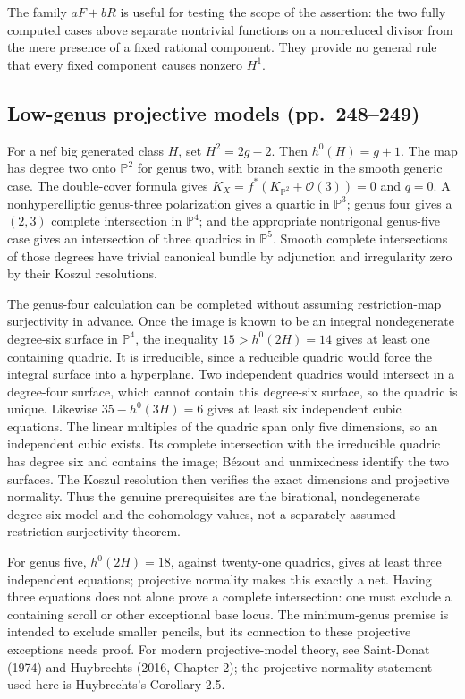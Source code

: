 The family \(aF+bR\) is useful for testing the scope of the assertion: the two fully computed cases above separate nontrivial functions on a nonreduced divisor from the mere presence of a fixed rational component. They provide no general rule that every fixed component causes nonzero \(H^1\).

\subsection{Low-genus projective models (pp.~248--249)}\label{cp2-vii-2-2}

For a nef big generated class \(H\), set \(H^2=2g-2\). Then \(h^0(H)=g+1\). The map has degree two onto \(\mathbb P^2\) for genus two, with branch sextic in the smooth generic case. The double-cover formula gives \(K_X=f^*(K_{\mathbb P^2}+\mathcal O(3))=0\) and \(q=0\). A nonhyperelliptic genus-three polarization gives a quartic in \(\mathbb P^3\); genus four gives a \((2,3)\) complete intersection in \(\mathbb P^4\); and the appropriate nontrigonal genus-five case gives an intersection of three quadrics in \(\mathbb P^5\). Smooth complete intersections of those degrees have trivial canonical bundle by adjunction and irregularity zero by their Koszul resolutions.

The genus-four calculation can be completed without assuming restriction-map surjectivity in advance. Once the image is known to be an integral nondegenerate degree-six surface in \(\mathbb P^4\), the inequality \(15>h^0(2H)=14\) gives at least one containing quadric. It is irreducible, since a reducible quadric would force the integral surface into a hyperplane. Two independent quadrics would intersect in a degree-four surface, which cannot contain this degree-six surface, so the quadric is unique. Likewise \(35-h^0(3H)=6\) gives at least six independent cubic equations. The linear multiples of the quadric span only five dimensions, so an independent cubic exists. Its complete intersection with the irreducible quadric has degree six and contains the image; Bézout and unmixedness identify the two surfaces. The Koszul resolution then verifies the exact dimensions and projective normality. Thus the genuine prerequisites are the birational, nondegenerate degree-six model and the cohomology values, not a separately assumed restriction-surjectivity theorem.

For genus five, \(h^0(2H)=18\), against twenty-one quadrics, gives at least three independent equations; projective normality makes this exactly a net. Having three equations does not alone prove a complete intersection: one must exclude a containing scroll or other exceptional base locus. The minimum-genus premise is intended to exclude smaller pencils, but its connection to these projective exceptions needs proof. For modern projective-model theory, see Saint-Donat (1974) and Huybrechts (2016, Chapter 2); the projective-normality statement used here is Huybrechts's Corollary 2.5.

